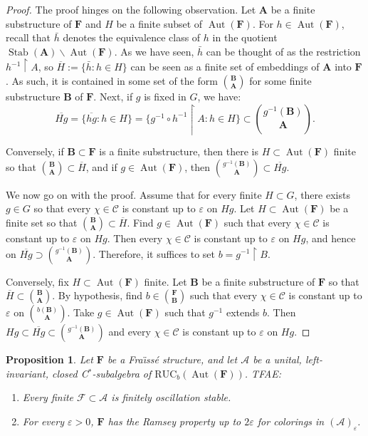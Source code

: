 \documentclass[11pt]{article}
\newtheorem{prop}[theo]{Proposition}
\theoremstyle{definition}
\numberwithin{equation}{section}
\numberwithin{figure}{section}
\numberwithin{table}{section}
\newcommand{\A}{\mathcal A}
\newcommand*{\mA}{\mathbf{A}}
\newcommand*{\mB}{\mathbf{B}}
\newcommand*{\mF}{\mathbf{F}}
\newcommand{\restrict}[2]{#1 \upharpoonright #2}
\newcommand{\e}{\varepsilon}
\DeclareMathOperator{\Aut}{Aut}
\DeclareMathOperator{\Stab}{Stab}
\newcommand{\RUCB}{\mathrm{RUC}_{b}}
\begin{document}
\begin{proof}
The proof hinges on the following observation. Let $\mA$ be a finite substructure of $\mF$ and $H$ be a finite subset of $\Aut(\mF)$. For $h\in \Aut(\mF)$, recall that $\bar h$ denotes the equivalence class of $h$ in the quotient $\Stab(\mA)\backslash \Aut(\mF)$. As we have seen, $\bar h$ can be thought of as the restriction $\restrict{h^{-1}}{A}$, so $\overline H:=\{ \bar h:h\in H\}$ can be seen as a finite set of embeddings of $\mA$ into $\mF$. As such, it is contained in some set of the form $\binom{\mB}{\mA}$ for some finite substructure $\mB$ of $\mF$. Next, if $g$ is fixed in $G$, we have:
\[
\overline{Hg} = \{ \overline{hg}:h\in H\}=\{ \restrict{g^{-1}\circ h^{-1}}{A} : h\in H\} \subset \binom{g^{-1}(\mB)}{\mA}.
\]

Conversely, if $\mB \subset \mF$ is a finite substructure, then there is $H\subset \Aut(\mF)$ finite so that $\binom{\mB}{\mA}\subset \overline H$, and if $g\in \Aut(\mF)$, then $\binom{g^{-1}(\mB)}{\mA} \subset \overline{Hg}$.

We now go on with the proof. Assume that for every finite $H\subset G$, there exists $g\in G$ so that every $\chi \in \mathcal C$ is constant up to $\varepsilon$ on $Hg$. Let $H\subset \Aut(\mF)$ be a finite set so that $\binom{\mB}{\mA} \subset \overline H$. Find $g\in \Aut(\mF)$ such that every $\chi\in \mathcal C$ is constant up to $\varepsilon$ on $Hg$. Then every $\chi\in \mathcal C$ is constant up to $\e$ on $Hg$, and hence on $\overline{Hg}\supset \binom{g^{-1}(\mB)}{\mA}$. Therefore, it suffices to set $b=\restrict{g^{-1}}{B}$.

Conversely, fix $H\subset \Aut(\mF)$ finite. Let $\mB$ be a finite substructure of $\mF$ so that $\overline{H} \subset \binom{\mB}{\mA}$. By hypothesis, find $b\in \binom{\mF}{\mB}$ such that every $\chi\in \mathcal C$ is constant up to $\e$ on $\binom{b(\mB)}{\mA}$. Take $g\in \Aut(\mF)$ such that $g^{-1}$ extends $b$. Then $Hg\subset \overline{Hg}\subset \binom{g^{-1}(\mB)}{\mA}$ and every $\chi\in \mathcal C$ is constant up to $\varepsilon$ on $Hg$.
\end{proof}

\begin{prop}\label{prop:OSRP}
Let $\mF$ be a Fra\"{\i}ss\'e structure, and let $\A$ be a unital, left-invariant, closed C$^{*}$-subalgebra of $\RUCB(\Aut(\mF))$. TFAE:
\begin{enumerate}
\item \label{3.4.1} Every finite $\mathcal F\subset \A$ is finitely oscillation stable.
\item \label{3.4.2} For every $\e>0$, $\mF$ has the Ramsey property up to $2\e$ for colorings in $(\A)_{\e}$.
\end{enumerate}
\end{prop}
\end{document}
